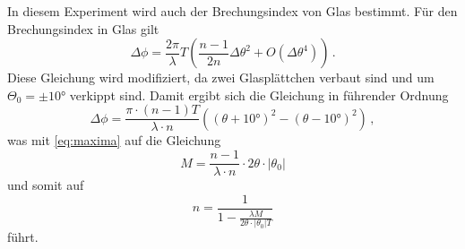 In diesem Experiment wird auch der Brechungsindex von Glas bestimmt. Für den Brechungsindex in Glas gilt
\begin{equation}\label{eq:phiglas}
    \Delta \phi = \frac{2\pi}{\lambda}T\left(\frac{n-1}{2n}\Delta \theta^2+O( \Delta \theta^4)\right) \, .
\end{equation}
Diese Gleichung wird modifiziert, da zwei Glasplättchen verbaut sind und um $\Theta_0 = \pm 10°$ verkippt sind. Damit ergibt sich die Gleichung in führender Ordnung
\begin{equation}
    \Delta \phi = \frac{\pi \cdot (n - 1) T}{\lambda \cdot n} \left(\left( \theta + 10° \right)^2 - \left( \theta - 10° \right)^2\right) \, ,
\end{equation}
was mit \autoref{eq:maxima} auf die Gleichung
\begin{equation*}
    M = \frac{n - 1}{\lambda \cdot n} \cdot 2 \theta \cdot |\theta_0|
\end{equation*}
und somit auf
\begin{equation} \label{eq:n_Glas}
    n = \frac{1}{1- \frac{\lambda M}{ 2 \theta \cdot |\theta_0| T}}
\end{equation}
führt.